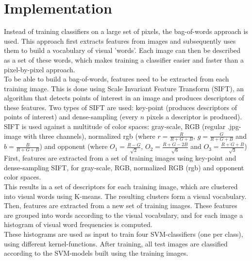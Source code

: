 \documentclass[12pt,a4paper]{amsart}
\begin{document}
\section{Implementation}
Instead of training classifiers on a large set of pixels, the bag-of-words approach is used. This approach first extracts features from images and subsequently uses them to build a vocabulary of visual 'words'. Each image can then be described as a set of these words, which makes training a classifier easier and faster than a pixel-by-pixel approach. \\
To be able to build a bag-of-words, features need to be extracted from each training image. This is done using Scale Invariant Feature Transform (SIFT), an algorithm that detects points of interest in an image and produces descriptors of these features. Two types of SIFT are used: key-point (produces descriptors of points of interest) and dense-sampling (every $n$ pixels a descriptor is produced). SIFT is used against a multitude of color spaces: gray-scale, RGB (regular .jpg-image with three channels), normalized rgb (where $r = \frac{R}{R+G+B}$, $g=\frac{G}{R+G+B}$ and $b= \frac{B}{R+G+B}$) and opponent (where $O_1 = \frac{R-G}{\sqrt{2}}$, $O_2 = \frac{R+G-2B}{\sqrt{6}}$ and $O_3 = \frac{R+G+B}{\sqrt{3}}$)
First, features are extracted from a set of training images using key-point and dense-sampling SIFT, for gray-scale, RGB, normalized RGB (rgb) and opponent color spaces. \\
This results in a set of descriptors for each training image, which are clustered into visual words using K-means. The resulting clusters form a visual vocabulary. \\
Then, features are extracted from a new set of training images. These features are grouped into words according to the visual vocabulary, and for each image a histogram of visual word frequencies is computed.\\
These histograms are used as input to train four SVM-classifiers (one per class), using different kernel-functions. After training, all test images are classified according to the SVM-models built using the training images.
\end{document}
